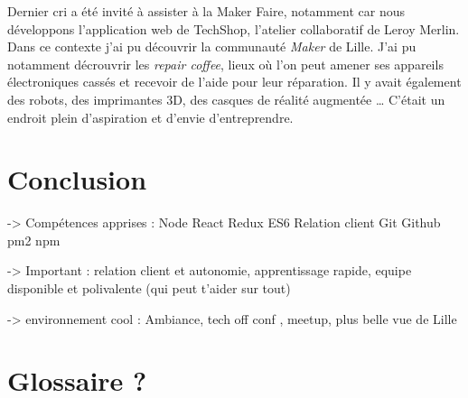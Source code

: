 \documentclass[12pt,a4paper]{article}
\begin{document}
  Dernier cri a été invité à assister à la Maker Faire, notamment car nous
  développons l'application web de TechShop, l'atelier collaboratif de
  Leroy Merlin. Dans ce contexte j'ai pu découvrir la communauté
  \emph{Maker} de Lille. J'ai pu notamment décrouvrir les \emph{repair
  coffee}, lieux où l'on peut amener ses appareils électroniques cassés et
  recevoir de l'aide pour leur réparation. Il y avait également des
  robots, des imprimantes 3D, des casques de réalité augmentée \ldots{}
  C'était un endroit plein d'aspiration et d'envie d'entreprendre.

  \newpage

  \section{Conclusion}\label{conclusion-2}

  -\textgreater{} Compétences apprises : Node React Redux ES6 Relation
  client Git Github pm2 npm

  -\textgreater{} Important : relation client et autonomie, apprentissage
  rapide, equipe disponible et polivalente (qui peut t'aider sur tout)

  -\textgreater{} environnement cool : Ambiance, tech off conf , meetup,
  plus belle vue de Lille

  \newpage

  \section{Glossaire ?}\label{glossaire}
\end{document}
